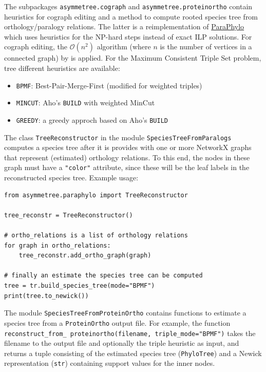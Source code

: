 \documentclass[hidelinks,11pt]{article}
\begin{document}
The subpackages \texttt{asymmetree.cograph} and \texttt{asymmetree.proteinortho} contain heuristics for cograph editing and a method to compute rooted species tree from orthology/paralogy relations.
The latter is a reimplementation of \href{http://pacosy.informatik.uni-leipzig.de/208-0-ParaPhylo.html}{ParaPhylo} \citep{hellmuth2015} which uses heuristics for the NP-hard steps instead of exact ILP solutions.
For cograph editing, the $\mathcal{O}(n^2)$ algorithm (where $n$ is the number of vertices in a connected graph) by \citet{crespelle2019} is applied.
For the Maximum Consistent Triple Set problem, tree different heuristics are available:
\begin{itemize}
	\item \texttt{BPMF}: Best-Pair-Merge-First \citep{wu2004} (modified for weighted triples)
	\item \texttt{MINCUT}: Aho's \texttt{BUILD} with weighted MinCut \citep{aho1981,byrka2010}
	\item \texttt{GREEDY}: a greedy approch based on Aho's \texttt{BUILD}
\end{itemize}

The class \texttt{TreeReconstructor} in the module \texttt{SpeciesTreeFromParalogs} computes a species tree after it is provides with one or more NetworkX graphs that represent (estimated) orthology relations.
To this end, the nodes in these graph must have a \texttt{"color"} attribute, since these will be the leaf labels in the reconstructed species tree.
Example usage:

\begin{adjustwidth}{1cm}{1cm}\vspace{2mm}
\begin{verbatim}
from asymmetree.paraphylo import TreeReconstructor

tree_reconstr = TreeReconstructor()

# ortho_relations is a list of orthology relations
for graph in ortho_relations:
    tree_reconstr.add_ortho_graph(graph)
    
# finally an estimate the species tree can be computed
tree = tr.build_species_tree(mode="BPMF")
print(tree.to_newick())
\end{verbatim}
\end{adjustwidth}

The module \texttt{SpeciesTreeFromProteinOrtho} contains functions to estimate a species tree from a \texttt{ProteinOrtho} \citep{lechner2011} output file. For example, the function \texttt{reconstruct\_from\_ proteinortho(filename, triple\_mode="BPMF")} takes the filename to the output file and optionally the triple heuristic as input, and returns a tuple consisting of the estimated species tree (\texttt{PhyloTree}) and a Newick representation (\texttt{str}) containing support values for the inner nodes.
\end{document}
